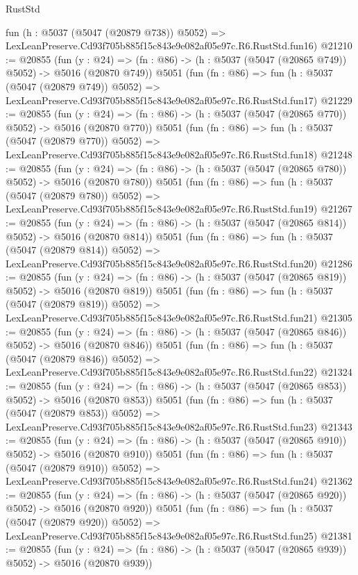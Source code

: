 \begin{lexlean}{RustStd}
\begin{coremodule}
    fun (h : @5037 (@5047 (@20879 @738)) @5052) =>
    LexLeanPreserve.Cd93f705b885f15c843e9e082af05e97c.R6.RustStd.fun16)
@21210 := @20855
    (fun (y : @24) => (fn : @86) -> (h : @5037 (@5047 (@20865 @749)) @5052) -> @5016 (@20870 @749))
    @5051
    (fun (fn : @86) =>
    fun (h : @5037 (@5047 (@20879 @749)) @5052) =>
    LexLeanPreserve.Cd93f705b885f15c843e9e082af05e97c.R6.RustStd.fun17)
@21229 := @20855
    (fun (y : @24) => (fn : @86) -> (h : @5037 (@5047 (@20865 @770)) @5052) -> @5016 (@20870 @770))
    @5051
    (fun (fn : @86) =>
    fun (h : @5037 (@5047 (@20879 @770)) @5052) =>
    LexLeanPreserve.Cd93f705b885f15c843e9e082af05e97c.R6.RustStd.fun18)
@21248 := @20855
    (fun (y : @24) => (fn : @86) -> (h : @5037 (@5047 (@20865 @780)) @5052) -> @5016 (@20870 @780))
    @5051
    (fun (fn : @86) =>
    fun (h : @5037 (@5047 (@20879 @780)) @5052) =>
    LexLeanPreserve.Cd93f705b885f15c843e9e082af05e97c.R6.RustStd.fun19)
@21267 := @20855
    (fun (y : @24) => (fn : @86) -> (h : @5037 (@5047 (@20865 @814)) @5052) -> @5016 (@20870 @814))
    @5051
    (fun (fn : @86) =>
    fun (h : @5037 (@5047 (@20879 @814)) @5052) =>
    LexLeanPreserve.Cd93f705b885f15c843e9e082af05e97c.R6.RustStd.fun20)
@21286 := @20855
    (fun (y : @24) => (fn : @86) -> (h : @5037 (@5047 (@20865 @819)) @5052) -> @5016 (@20870 @819))
    @5051
    (fun (fn : @86) =>
    fun (h : @5037 (@5047 (@20879 @819)) @5052) =>
    LexLeanPreserve.Cd93f705b885f15c843e9e082af05e97c.R6.RustStd.fun21)
@21305 := @20855
    (fun (y : @24) => (fn : @86) -> (h : @5037 (@5047 (@20865 @846)) @5052) -> @5016 (@20870 @846))
    @5051
    (fun (fn : @86) =>
    fun (h : @5037 (@5047 (@20879 @846)) @5052) =>
    LexLeanPreserve.Cd93f705b885f15c843e9e082af05e97c.R6.RustStd.fun22)
@21324 := @20855
    (fun (y : @24) => (fn : @86) -> (h : @5037 (@5047 (@20865 @853)) @5052) -> @5016 (@20870 @853))
    @5051
    (fun (fn : @86) =>
    fun (h : @5037 (@5047 (@20879 @853)) @5052) =>
    LexLeanPreserve.Cd93f705b885f15c843e9e082af05e97c.R6.RustStd.fun23)
@21343 := @20855
    (fun (y : @24) => (fn : @86) -> (h : @5037 (@5047 (@20865 @910)) @5052) -> @5016 (@20870 @910))
    @5051
    (fun (fn : @86) =>
    fun (h : @5037 (@5047 (@20879 @910)) @5052) =>
    LexLeanPreserve.Cd93f705b885f15c843e9e082af05e97c.R6.RustStd.fun24)
@21362 := @20855
    (fun (y : @24) => (fn : @86) -> (h : @5037 (@5047 (@20865 @920)) @5052) -> @5016 (@20870 @920))
    @5051
    (fun (fn : @86) =>
    fun (h : @5037 (@5047 (@20879 @920)) @5052) =>
    LexLeanPreserve.Cd93f705b885f15c843e9e082af05e97c.R6.RustStd.fun25)
@21381 := @20855
    (fun (y : @24) => (fn : @86) -> (h : @5037 (@5047 (@20865 @939)) @5052) -> @5016 (@20870 @939))

\end{coremodule}
\end{lexlean}
